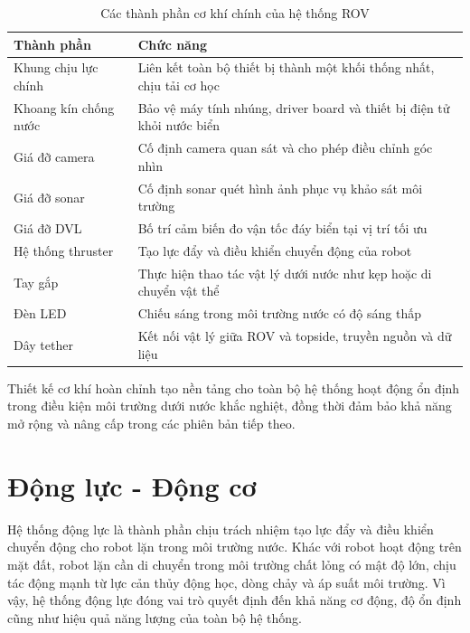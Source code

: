 \documentclass[../DoAn.tex]{subfiles}
\begin{document}
\begin{table}[H]
\centering
\caption{Các thành phần cơ khí chính của hệ thống ROV}
\label{tab:mechanical_components}
\begin{tabular}{|p{4cm}|p{9cm}|}
\hline
\textbf{Thành phần} & \textbf{Chức năng} \\ \hline

Khung chịu lực chính &
Liên kết toàn bộ thiết bị thành một khối thống nhất, chịu tải cơ học \\ \hline

Khoang kín chống nước &
Bảo vệ máy tính nhúng, driver board và thiết bị điện tử khỏi nước biển \\ \hline

Giá đỡ camera &
Cố định camera quan sát và cho phép điều chỉnh góc nhìn \\ \hline

Giá đỡ sonar &
Cố định sonar quét hình ảnh phục vụ khảo sát môi trường \\ \hline

Giá đỡ DVL &
Bố trí cảm biến đo vận tốc đáy biển tại vị trí tối ưu \\ \hline

Hệ thống thruster &
Tạo lực đẩy và điều khiển chuyển động của robot \\ \hline

Tay gắp &
Thực hiện thao tác vật lý dưới nước như kẹp hoặc di chuyển vật thể \\ \hline

Đèn LED &
Chiếu sáng trong môi trường nước có độ sáng thấp \\ \hline

Dây tether &
Kết nối vật lý giữa ROV và topside, truyền nguồn và dữ liệu \\ \hline

\end{tabular}
\end{table}

Thiết kế cơ khí hoàn chỉnh tạo nền tảng cho toàn bộ hệ thống hoạt động ổn định trong điều kiện môi trường dưới nước khắc nghiệt, đồng thời đảm bảo khả năng mở rộng và nâng cấp trong các phiên bản tiếp theo.
\section{Động lực - Động cơ}
\label{section:2.2}

Hệ thống động lực là thành phần chịu trách nhiệm tạo lực đẩy và điều khiển chuyển động cho robot lặn trong môi trường nước. Khác với robot hoạt động trên mặt đất, robot lặn cần di chuyển trong môi trường chất lỏng có mật độ lớn, chịu tác động mạnh từ lực cản thủy động học, dòng chảy và áp suất môi trường. Vì vậy, hệ thống động lực đóng vai trò quyết định đến khả năng cơ động, độ ổn định cũng như hiệu quả năng lượng của toàn bộ hệ thống.
\end{document}
